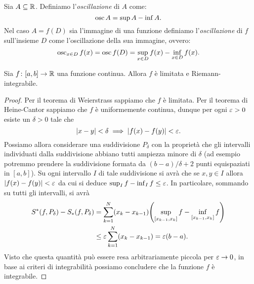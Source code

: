 \begin{definition}\label{def:osc}
Sia $A\subseteq {\mathbb R}$. Definiamo 
l'\emph{oscillazione} di $A$ come:
\[
  \operatorname{osc} A = \sup A - \inf A.
\]
Nel caso $A=f(D)$ sia l'immagine di una funzione 
definiamo l'\emph{oscillazione} di $f$ sull'insieme 
$D$ come l'oscillazione della sua immagine, ovvero:
\[
   \operatorname{osc}_{x\in D} f(x) 
   = \operatorname{osc} f(D) 
   = \sup_{x\in D} f(x) - \inf_{x\in D} f(x).  
\]
\end{definition}

\begin{theorem}
  \mymark{***}
  \label{th:integrabilita_continue}
  Sia $f\colon [a,b]\to {\mathbb R}$ una funzione continua.
  Allora $f$ è limitata e Riemann-integrabile.
  \end{theorem}
  \begin{proof}
  \mymark{***}
  Per il teorema di Weierstrass sappiamo che $f$ è limitata.
  Per il teorema di Heine-Cantor sappiamo che $f$ è uniformemente continua,
  dunque per ogni $\varepsilon>0$ esiste un $\delta>0$ tale che
  \[
   {\left|x-y\right|} < \delta \implies {\left|f(x)-f(y)\right|} < \varepsilon.
  \]
  Possiamo allora considerare una suddivisione $P_\delta$ con la proprietà che
  gli intervalli individuati dalla suddivisione abbiano tutti ampiezza minore di
  $\delta$ (ad esempio potremmo prendere la suddivisione formata da
  $(b-a)/\delta+2$ punti equispaziati in $[a,b]$). Su ogni intervallo $I$ di tale
  suddivisione si avrà che se $x,y\in I$ allora ${\left|f(x)-f(y)\right|} < \varepsilon$ da cui
  si deduce $\sup_I f - \inf_I f \le \varepsilon$.
  In particolare, sommando su tutti gli intervalli, si avrà
  \begin{align*}
    S^*(f,P_\delta) - S_*(f,P_\delta)
    &= \sum_{k=1}^N (x_k-x_{k-1}){\left( \sup_{[x_{k-1},x_k]} f - \inf_{[x_{k-1},x_k]} f \right)} \\
    &\le \varepsilon \sum_{k=1}^N (x_k - x_{k-1})
     = \varepsilon (b-a).
  \end{align*}
  Visto che questa quantità può essere resa arbitrariamente piccola per
  $\varepsilon \to 0$, in base ai criteri di integrabilità possiamo concludere che la
  funzione $f$ è integrabile.
  \end{proof}
  
